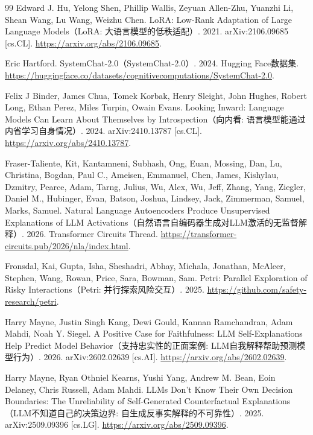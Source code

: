 \begin{thebibliography}{99}
 Edward J. Hu, Yelong Shen, Phillip Wallis, Zeyuan Allen-Zhu, Yuanzhi Li, Shean Wang, Lu Wang, Weizhu Chen. LoRA: Low-Rank Adaptation of Large Language Models（LoRA: 大语言模型的低秩适配）. 2021. arXiv:2106.09685 [cs.CL]. \url{https://arxiv.org/abs/2106.09685}.

 Eric Hartford. SystemChat-2.0（SystemChat-2.0）. 2024. Hugging Face数据集. \url{https://huggingface.co/datasets/cognitivecomputations/SystemChat-2.0}.

 Felix J Binder, James Chua, Tomek Korbak, Henry Sleight, John Hughes, Robert Long, Ethan Perez, Miles Turpin, Owain Evans. Looking Inward: Language Models Can Learn About Themselves by Introspection（向内看: 语言模型能通过内省学习自身情况）. 2024. arXiv:2410.13787 [cs.CL]. \url{https://arxiv.org/abs/2410.13787}.

 Fraser-Taliente, Kit, Kantamneni, Subhash, Ong, Euan, Mossing, Dan, Lu, Christina, Bogdan, Paul C., Ameisen, Emmanuel, Chen, James, Kishylau, Dzmitry, Pearce, Adam, Tarng, Julius, Wu, Alex, Wu, Jeff, Zhang, Yang, Ziegler, Daniel M., Hubinger, Evan, Batson, Joshua, Lindsey, Jack, Zimmerman, Samuel, Marks, Samuel. Natural Language Autoencoders Produce Unsupervised Explanations of LLM Activations（自然语言自编码器生成对LLM激活的无监督解释）. 2026. Transformer Circuits Thread. \url{https://transformer-circuits.pub/2026/nla/index.html}.

 Fronsdal, Kai, Gupta, Isha, Sheshadri, Abhay, Michala, Jonathan, McAleer, Stephen, Wang, Rowan, Price, Sara, Bowman, Sam. Petri: Parallel Exploration of Risky Interactions（Petri: 并行探索风险交互）. 2025. \url{https://github.com/safety-research/petri}.

 Harry Mayne, Justin Singh Kang, Dewi Gould, Kannan Ramchandran, Adam Mahdi, Noah Y. Siegel. A Positive Case for Faithfulness: LLM Self-Explanations Help Predict Model Behavior（支持忠实性的正面案例: LLM自我解释帮助预测模型行为）. 2026. arXiv:2602.02639 [cs.AI]. \url{https://arxiv.org/abs/2602.02639}.

 Harry Mayne, Ryan Othniel Kearns, Yushi Yang, Andrew M. Bean, Eoin Delaney, Chris Russell, Adam Mahdi. LLMs Don't Know Their Own Decision Boundaries: The Unreliability of Self-Generated Counterfactual Explanations（LLM不知道自己的决策边界: 自生成反事实解释的不可靠性）. 2025. arXiv:2509.09396 [cs.LG]. \url{https://arxiv.org/abs/2509.09396}.


\end{thebibliography}
